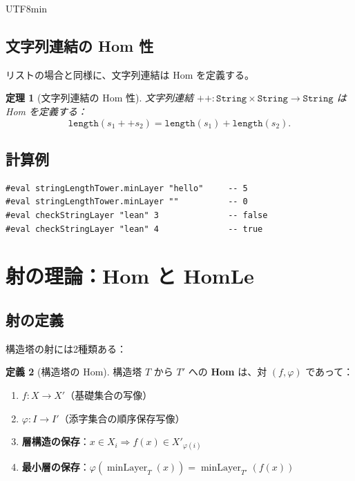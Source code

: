 \documentclass[12pt,a4paper]{article}
\newtheorem{theorem}{定理}[section]
\theoremstyle{definition}
\newtheorem{definition}[theorem]{定義}
\theoremstyle{remark}
\DeclareMathOperator{\minLayer}{minLayer}
\begin{document}
\begin{CJK}{UTF8}{min}
\subsection{文字列連結の Hom 性}

リストの場合と同様に、文字列連結は Hom を定義する。

\begin{theorem}[文字列連結の Hom 性]
文字列連結 $++: \texttt{String} \times \texttt{String} \to \texttt{String}$ は Hom を定義する：
$$\texttt{length}(s_1 ++ s_2) = \texttt{length}(s_1) + \texttt{length}(s_2).$$
\end{theorem}

\subsection{計算例}

\begin{tcolorbox}[title=Lean での実装例]
\begin{verbatim}
#eval stringLengthTower.minLayer "hello"     -- 5
#eval stringLengthTower.minLayer ""          -- 0
#eval checkStringLayer "lean" 3              -- false
#eval checkStringLayer "lean" 4              -- true
\end{verbatim}
\end{tcolorbox}

\section{射の理論：Hom と HomLe}

\subsection{射の定義}

構造塔の射には2種類ある：

\begin{definition}[構造塔の Hom]
構造塔 $T$ から $T'$ への \textbf{Hom} は、対 $(f, \varphi)$ であって：
\begin{enumerate}
\item $f: X \to X'$（基礎集合の写像）
\item $\varphi: I \to I'$（添字集合の順序保存写像）
\item \textbf{層構造の保存}：$x \in X_i \Rightarrow f(x) \in X'_{\varphi(i)}$
\item \textbf{最小層の保存}：$\varphi(\minLayer_T(x)) = \minLayer_{T'}(f(x))$
\end{enumerate}
\end{definition}


\end{CJK}
\end{document}

